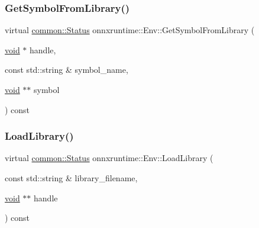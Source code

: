 \mbox{\label{classonnxruntime_1_1Env_a0ac6efcb6758ce44ff78c7eb158615b4}} 
\subsubsection{\texorpdfstring{Get\+Symbol\+From\+Library()}{GetSymbolFromLibrary()}}
{\footnotesize\ttfamily virtual \mbox{\hyperlink{classonnxruntime_1_1common_1_1Status}{common\+::\+Status}} onnxruntime\+::\+Env\+::\+Get\+Symbol\+From\+Library (\begin{DoxyParamCaption}\item[{\mbox{\hyperlink{mlasi_8h_a88f941d423cb2a819b70a1358982b1a6}{void}} $\ast$}]{handle,  }\item[{const std\+::string \&}]{symbol\+\_\+name,  }\item[{\mbox{\hyperlink{mlasi_8h_a88f941d423cb2a819b70a1358982b1a6}{void}} $\ast$$\ast$}]{symbol }\end{DoxyParamCaption}) const\hspace{0.3cm}{\ttfamily [pure virtual]}}

\mbox{\label{classonnxruntime_1_1Env_acb9c20a7aca7ff9f33088d18a95cc81b}} 
\subsubsection{\texorpdfstring{Load\+Library()}{LoadLibrary()}}
{\footnotesize\ttfamily virtual \mbox{\hyperlink{classonnxruntime_1_1common_1_1Status}{common\+::\+Status}} onnxruntime\+::\+Env\+::\+Load\+Library (\begin{DoxyParamCaption}\item[{const std\+::string \&}]{library\+\_\+filename,  }\item[{\mbox{\hyperlink{mlasi_8h_a88f941d423cb2a819b70a1358982b1a6}{void}} $\ast$$\ast$}]{handle }\end{DoxyParamCaption}) const\hspace{0.3cm}{\ttfamily [pure virtual]}}

\mbox{\label{classonnxruntime_1_1Env_a001849df94fd8eb65a81a70307197061}} 
